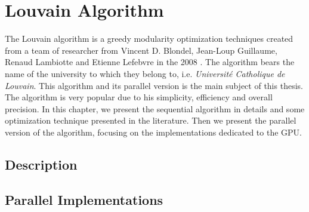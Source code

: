 
\section{Louvain Algorithm}
The Louvain algorithm is a greedy modularity optimization techniques created from a team of researcher from Vincent D. Blondel, Jean-Loup Guillaume, Renaud Lambiotte and Etienne Lefebvre in the 2008 \cite{Blondel_2008}. The algorithm bears the name of the university to which they belong to, i.e. \textit{Université Catholique de Louvain}. This algorithm and its parallel version is the main subject of this thesis. The algorithm is very popular due to his simplicity, efficiency and overall precision.
In this chapter, we present the sequential algorithm in details and some optimization technique presented in the literature.
Then we present the parallel version of the algorithm, focusing on the implementations dedicated to the GPU.
\subsection{Description}
\subsection{Parallel Implementations}

